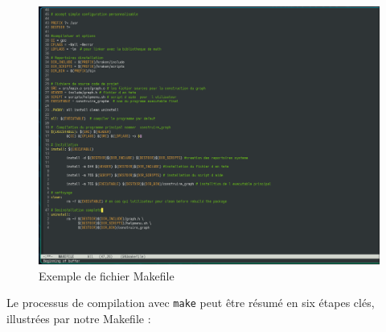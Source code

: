 \begin{figure}[H]
  \centering
  \includegraphics[width=\textwidth]{images_pfe/makefileexemple.png}
  \caption{Exemple de fichier Makefile}
  \label{fig:makefileexemple}
\end{figure}
\clearpage
Le processus de compilation avec \texttt{make} peut être résumé en six étapes clés, illustrées par notre Makefile :

